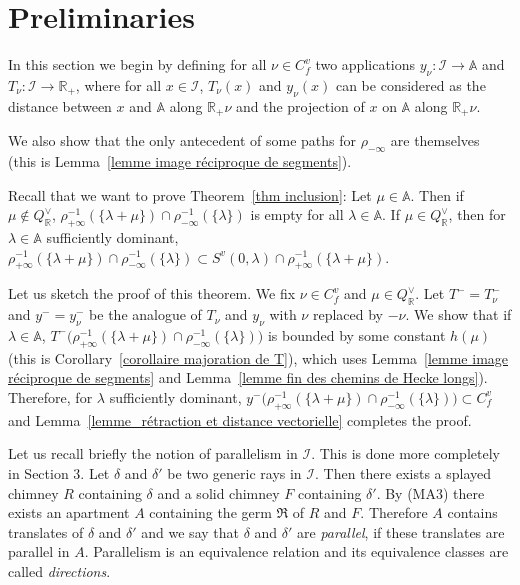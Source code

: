 \documentclass[12pt]{article}
\theoremstyle{plain}
\theoremstyle{definition}
\newcommand{\R}{\mathbb{R}}
\newcommand{\A}{\mathbb{A}}
\newcommand{\I}{\mathcal{I}}
\begin{document}
\section{Preliminaries}\label{sect preliminaries}

In this section we begin by defining for all $\nu\in C_f^v$ two applications $y_\nu:\I\rightarrow \A$ and $T_\nu:\I\rightarrow \R_+$, where for all $x\in \I$, $T_\nu(x)$ and $y_\nu(x)$ can be considered as the distance between $x$ and $\A$ along $\R_+\nu$ and the projection of $x$ on $\A$ along $\R_+\nu$. 

We also show that the only antecedent of some paths for $\rho_{-\infty}$ are themselves (this is Lemma~\ref{lemme image réciproque de segments}).

\vspace{3mm}
Recall that we want to prove Theorem~\ref{thm inclusion}: Let $\mu\in \A$. Then if $\mu\notin Q_{\R}^\vee$, $\rho_{+\infty}^{-1}(\{\lambda+\mu\})\cap \rho_{-\infty}^{-1}(\{\lambda\})$ is empty for all $\lambda\in \A$. If $\mu\in Q^\vee_{\R}$, then for $\lambda\in \A$ sufficiently dominant, $\rho_{+\infty}^{-1}(\{\lambda+\mu\})\cap \rho_{-\infty}^{-1}(\{\lambda\})\subset S^v(0,\lambda)\cap \rho_{+\infty}^{-1}(\{\lambda+\mu\}) $.





Let us sketch the proof of this theorem. We fix $\nu\in C_f^v$ and $\mu\in Q^\vee_\R$. Let $T^-=T_{\nu}^-$ and $y^-=y_\nu^-$ be the analogue of $T_\nu$ and $y_\nu$ with $\nu$ replaced by $-\nu$. We show that if $\lambda\in \A$, $T^-\big(\rho_{+\infty}^{-1}(\{\lambda+\mu\})\cap \rho_{-\infty}^{-1}(\{\lambda\})\big)$ is bounded by some constant $h(\mu)$ (this is Corollary~\ref{corollaire majoration de T}), which uses Lemma~\ref{lemme image réciproque de segments} and Lemma~\ref{lemme fin des chemins de Hecke longs}). Therefore, for $\lambda$ sufficiently dominant, $y^-\big(\rho_{+\infty}^{-1}(\{\lambda+\mu\})\cap \rho_{-\infty}^{-1}(\{\lambda\})\big)\subset C_f^v$ and Lemma~\ref{lemme_rétraction et distance vectorielle} completes the proof.

\vspace{3mm}
Let us recall briefly the notion of parallelism in $\I$. This is done more completely in \cite{rousseau2011masures} Section 3. Let $\delta$ and $\delta'$ be two generic rays in $\I$. Then there exists a splayed chimney $R$ containing $\delta$ and a solid chimney $F$ containing $\delta'$. By (MA3) there exists an apartment $A$ containing the germ $\mathfrak{R}$ of $R$ and $F$. Therefore $A$ contains translates of $\delta$ and $\delta'$ and we say that $\delta$ and $\delta'$ are \textit{parallel}, if these translates are parallel in $A$. Parallelism is an equivalence relation and its equivalence classes are called \textit{directions}.
\end{document}
